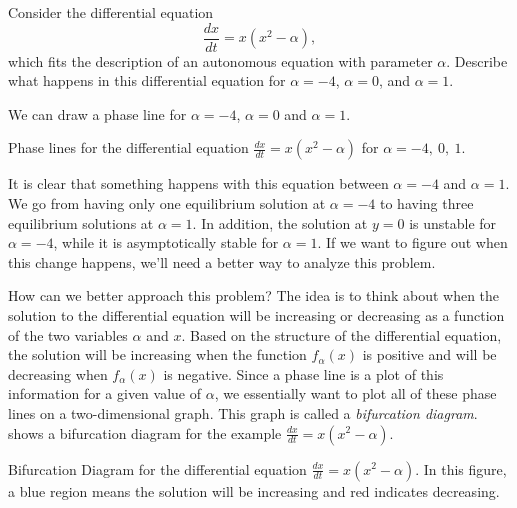 \begin{example}
Consider the differential equation
\begin{equation*}
\frac{dx}{dt} = x(x^2 - \alpha),
\end{equation*}
which fits the description of an autonomous equation with parameter $\alpha$. Describe what happens in this differential equation for $\alpha = -4$, $\alpha = 0$, and $\alpha = 1$. 
\end{example}
\begin{exampleSol}
We can draw a phase line for $\alpha = -4$, $\alpha = 0$ and $\alpha = 1$. 
\begin{myfig}
\capstart
{}
\caption{Phase lines for the differential equation $\frac{dx}{dt} = x(x^2 - \alpha)$ for $\alpha = -4,\ 0,\ 1$. \label{autobif_plplot:fig}}
\end{myfig}
It is clear that something happens with this equation between $\alpha = -4$ and $\alpha = 1$. We go from having only one equilibrium solution at $\alpha = -4$ to having three equilibrium solutions at $\alpha = 1$. In addition, the solution at $y=0$ is unstable for $\alpha = -4$, while it is asymptotically stable for $\alpha = 1$. If we want to figure out when this change happens, we'll need a better way to analyze this problem.
\end{exampleSol}

How can we better approach this problem? The idea is to think about when the solution to the differential equation will be increasing or decreasing as a function of the two variables $\alpha$ and $x$. Based on the structure of the differential equation, the solution will be increasing when the function $f_\alpha(x)$ is positive and will be decreasing when $f_\alpha(x)$ is negative. Since a phase line is a plot of this information for a given value of $\alpha$, we essentially want to plot all of these phase lines on a two-dimensional graph. This graph is called a \emph{bifurcation diagram}.  shows a bifurcation diagram for the example $\frac{dx}{dt} = x(x^2-\alpha)$.
\begin{myfig}
\capstart
{}
\caption{Bifurcation Diagram for the differential equation $\frac{dx}{dt} = x(x^2 - \alpha)$. In this figure, a blue region means the solution will be increasing and red indicates decreasing. \label{bifdiag_ex1:fig}}
\end{myfig}

